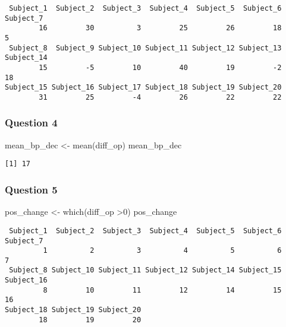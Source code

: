 \documentclass[
  letterpaper,
  DIV=11,
  numbers=noendperiod]{scrartcl}
\newenvironment{Shaded}{\begin{snugshade}}{\end{snugshade}}
\newcommand{\DecValTok}[1]{\textcolor[rgb]{0.68,0.00,0.00}{#1}}
\newcommand{\FunctionTok}[1]{\textcolor[rgb]{0.28,0.35,0.67}{#1}}
\newcommand{\NormalTok}[1]{\textcolor[rgb]{0.00,0.23,0.31}{#1}}
\newcommand{\OtherTok}[1]{\textcolor[rgb]{0.00,0.23,0.31}{#1}}
\newcommand{\SpecialCharTok}[1]{\textcolor[rgb]{0.37,0.37,0.37}{#1}}
\begin{document}
\begin{verbatim}
 Subject_1  Subject_2  Subject_3  Subject_4  Subject_5  Subject_6  Subject_7 
        16         30          3         25         26         18          5 
 Subject_8  Subject_9 Subject_10 Subject_11 Subject_12 Subject_13 Subject_14 
        15         -5         10         40         19         -2         18 
Subject_15 Subject_16 Subject_17 Subject_18 Subject_19 Subject_20 
        31         25         -4         26         22         22 
\end{verbatim}

\subsubsection{Question 4}\label{question-4}

\begin{Shaded}
\begin{Highlighting}[]
\NormalTok{mean\_bp\_dec }\OtherTok{\textless{}{-}} \FunctionTok{mean}\NormalTok{(diff\_op)}
\NormalTok{mean\_bp\_dec}
\end{Highlighting}
\end{Shaded}

\begin{verbatim}
[1] 17
\end{verbatim}

\subsubsection{Question 5}\label{question-5}

\begin{Shaded}
\begin{Highlighting}[]
\NormalTok{pos\_change }\OtherTok{\textless{}{-}} \FunctionTok{which}\NormalTok{(diff\_op }\SpecialCharTok{\textgreater{}}\DecValTok{0}\NormalTok{)}
\NormalTok{pos\_change}
\end{Highlighting}
\end{Shaded}

\begin{verbatim}
 Subject_1  Subject_2  Subject_3  Subject_4  Subject_5  Subject_6  Subject_7 
         1          2          3          4          5          6          7 
 Subject_8 Subject_10 Subject_11 Subject_12 Subject_14 Subject_15 Subject_16 
         8         10         11         12         14         15         16 
Subject_18 Subject_19 Subject_20 
        18         19         20 
\end{verbatim}
\end{document}
